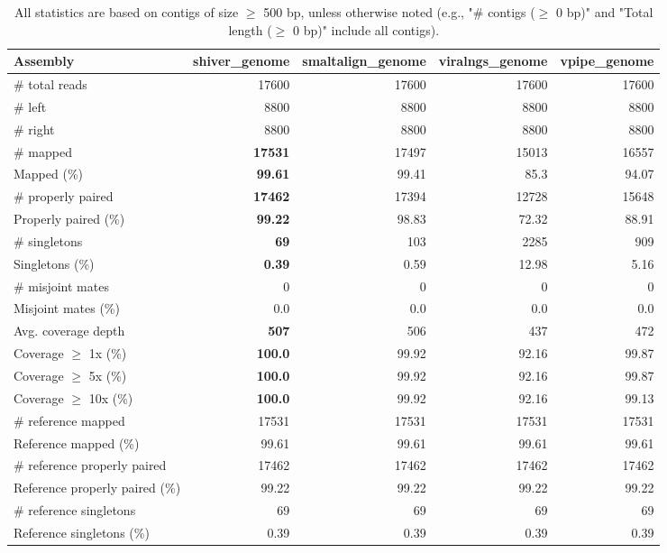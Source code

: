 \documentclass[12pt,a4paper]{article}
\begin{document}
\begin{table}[ht]
\begin{center}
\caption{All statistics are based on contigs of size $\geq$ 500 bp, unless otherwise noted (e.g., "\# contigs ($\geq$ 0 bp)" and "Total length ($\geq$ 0 bp)" include all contigs).}
\begin{tabular}{|l*{4}{|r}|}
\hline
Assembly & shiver\_genome & smaltalign\_genome & viralngs\_genome & vpipe\_genome \\ \hline
\# total reads & 17600 & 17600 & 17600 & 17600 \\ \hline
\# left & 8800 & 8800 & 8800 & 8800 \\ \hline
\# right & 8800 & 8800 & 8800 & 8800 \\ \hline
\# mapped & {\bf 17531} & 17497 & 15013 & 16557 \\ \hline
Mapped (\%) & {\bf 99.61} & 99.41 & 85.3 & 94.07 \\ \hline
\# properly paired & {\bf 17462} & 17394 & 12728 & 15648 \\ \hline
Properly paired (\%) & {\bf 99.22} & 98.83 & 72.32 & 88.91 \\ \hline
\# singletons & {\bf 69} & 103 & 2285 & 909 \\ \hline
Singletons (\%) & {\bf 0.39} & 0.59 & 12.98 & 5.16 \\ \hline
\# misjoint mates & 0 & 0 & 0 & 0 \\ \hline
Misjoint mates (\%) & 0.0 & 0.0 & 0.0 & 0.0 \\ \hline
Avg. coverage depth & {\bf 507} & 506 & 437 & 472 \\ \hline
Coverage $\geq$ 1x (\%) & {\bf 100.0} & 99.92 & 92.16 & 99.87 \\ \hline
Coverage $\geq$ 5x (\%) & {\bf 100.0} & 99.92 & 92.16 & 99.87 \\ \hline
Coverage $\geq$ 10x (\%) & {\bf 100.0} & 99.92 & 92.16 & 99.13 \\ \hline
\# reference mapped & 17531 & 17531 & 17531 & 17531 \\ \hline
Reference mapped (\%) & 99.61 & 99.61 & 99.61 & 99.61 \\ \hline
\# reference properly paired & 17462 & 17462 & 17462 & 17462 \\ \hline
Reference properly paired (\%) & 99.22 & 99.22 & 99.22 & 99.22 \\ \hline
\# reference singletons & 69 & 69 & 69 & 69 \\ \hline
Reference singletons (\%) & 0.39 & 0.39 & 0.39 & 0.39 \\ \hline

\end{tabular}
\end{center}
\end{table}
\end{document}
